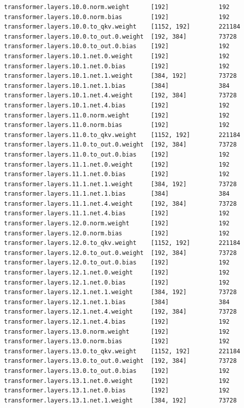 \documentclass[notitlepage,cs4size,punct,oneside]{ctexrep}
\numberwithin{equation}{chapter}
\theoremstyle{mystyle}
\begin{document}
\begin{appendices}
{\begin{lstlisting}[style=output]
transformer.layers.10.0.norm.weight      [192]              192
transformer.layers.10.0.norm.bias        [192]              192
transformer.layers.10.0.to_qkv.weight    [1152, 192]        221184
transformer.layers.10.0.to_out.0.weight  [192, 384]         73728
transformer.layers.10.0.to_out.0.bias    [192]              192
transformer.layers.10.1.net.0.weight     [192]              192
transformer.layers.10.1.net.0.bias       [192]              192
transformer.layers.10.1.net.1.weight     [384, 192]         73728
transformer.layers.10.1.net.1.bias       [384]              384
transformer.layers.10.1.net.4.weight     [192, 384]         73728
transformer.layers.10.1.net.4.bias       [192]              192
transformer.layers.11.0.norm.weight      [192]              192
transformer.layers.11.0.norm.bias        [192]              192
transformer.layers.11.0.to_qkv.weight    [1152, 192]        221184
transformer.layers.11.0.to_out.0.weight  [192, 384]         73728
transformer.layers.11.0.to_out.0.bias    [192]              192
transformer.layers.11.1.net.0.weight     [192]              192
transformer.layers.11.1.net.0.bias       [192]              192
transformer.layers.11.1.net.1.weight     [384, 192]         73728
transformer.layers.11.1.net.1.bias       [384]              384
transformer.layers.11.1.net.4.weight     [192, 384]         73728
transformer.layers.11.1.net.4.bias       [192]              192
transformer.layers.12.0.norm.weight      [192]              192
transformer.layers.12.0.norm.bias        [192]              192
transformer.layers.12.0.to_qkv.weight    [1152, 192]        221184
transformer.layers.12.0.to_out.0.weight  [192, 384]         73728
transformer.layers.12.0.to_out.0.bias    [192]              192
transformer.layers.12.1.net.0.weight     [192]              192
transformer.layers.12.1.net.0.bias       [192]              192
transformer.layers.12.1.net.1.weight     [384, 192]         73728
transformer.layers.12.1.net.1.bias       [384]              384
transformer.layers.12.1.net.4.weight     [192, 384]         73728
transformer.layers.12.1.net.4.bias       [192]              192
transformer.layers.13.0.norm.weight      [192]              192
transformer.layers.13.0.norm.bias        [192]              192
transformer.layers.13.0.to_qkv.weight    [1152, 192]        221184
transformer.layers.13.0.to_out.0.weight  [192, 384]         73728
transformer.layers.13.0.to_out.0.bias    [192]              192
transformer.layers.13.1.net.0.weight     [192]              192
transformer.layers.13.1.net.0.bias       [192]              192
transformer.layers.13.1.net.1.weight     [384, 192]         73728

\end{lstlisting}}
\end{appendices}
\end{document}
